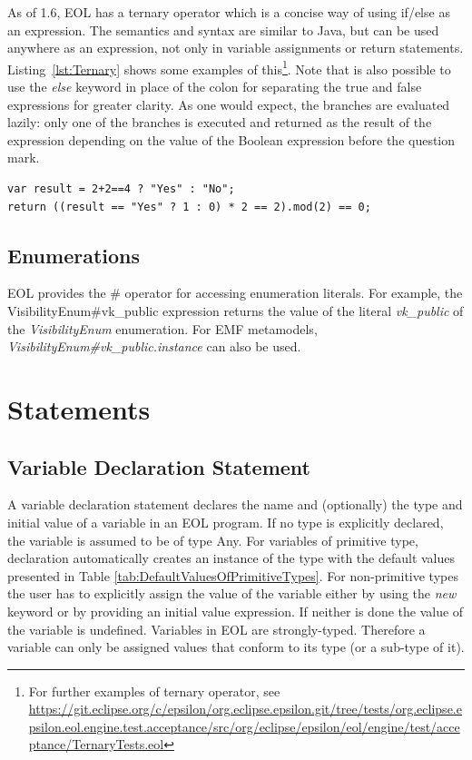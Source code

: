 As of 1.6, EOL has a ternary operator which is a concise way of using if/else as an expression. The semantics and syntax are similar to Java, but can be used anywhere as an expression, not only in variable assignments or return statements. Listing~\ref{lst:Ternary} shows some examples of this\footnote{For further examples of ternary operator, see \url{https://git.eclipse.org/c/epsilon/org.eclipse.epsilon.git/tree/tests/org.eclipse.epsilon.eol.engine.test.acceptance/src/org/eclipse/epsilon/eol/engine/test/acceptance/TernaryTests.eol}}. Note that is also possible to use the \emph{else} keyword in place of the colon for separating the true and false expressions for greater clarity. As one would expect, the branches are evaluated lazily: only one of the branches is executed and returned as the result of the expression depending on the value of the Boolean expression before the question mark.

\begin{lstlisting}[float=tbp, caption=EOL ternary syntax, label=lst:Ternary, language=EOL]
var result = 2+2==4 ? "Yes" : "No";
return ((result == "Yes" ? 1 : 0) * 2 == 2).mod(2) == 0;
\end{lstlisting}

\subsection{Enumerations}

EOL provides the \# operator for accessing enumeration literals. For example, the VisibilityEnum\#vk\_public expression returns the value of the literal \emph{vk\_public} of the \emph{VisibilityEnum} enumeration. For EMF metamodels, \emph{VisibilityEnum\#vk\_public.instance} can also be used.

\section{Statements}

\subsection{Variable Declaration Statement}

A variable declaration statement declares the name and (optionally) the type and initial value of a variable in an EOL program. If no type is explicitly declared, the variable is assumed to be of type Any. For variables of primitive type, declaration automatically creates an instance of the type with the default values presented in Table \ref{tab:DefaultValuesOfPrimitiveTypes}. For non-primitive types the user has to explicitly assign the value of the variable either by using the \emph{new} keyword or by providing an initial value expression. If neither is done the value of the variable is undefined. Variables in EOL are strongly-typed. Therefore a variable can only be assigned values that conform to its type (or a sub-type of it).

